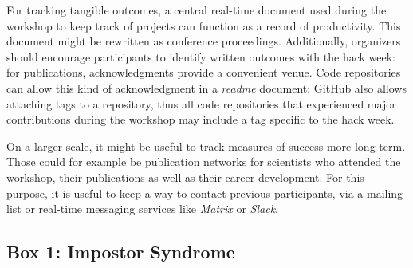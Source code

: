 \documentclass{nature}
\begin{document}
For tracking tangible outcomes, a central real-time document used during the workshop to keep track of projects can function as a record of productivity. This document might be rewritten as conference proceedings. Additionally, organizers should encourage participants to identify written outcomes with the hack week: for publications, acknowledgments provide a convenient venue. Code repositories can allow this kind of acknowledgment in a \textit{readme} document; GitHub also allows attaching tags to a repository, thus all code repositories that experienced major contributions during the workshop may include a tag specific to the hack week.

On a larger scale, it might be useful to track measures of success more long-term. Those could for example be publication networks for scientists who attended the workshop, their publications as well as their career development. For this purpose, it is useful to keep a way to contact previous participants, via a mailing list or real-time messaging services like \textit{Matrix} or \textit{Slack}.


\subsection*{Box 1: Impostor Syndrome}
\end{document}
